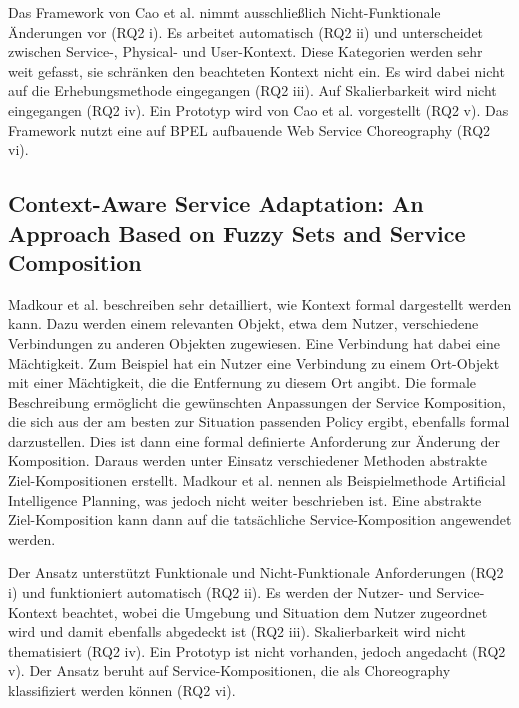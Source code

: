 \documentclass[conference,compsoc]{IEEEtran}
\begin{document}
Das Framework von Cao et al. \cite{CZZ15} nimmt ausschließlich Nicht-Funktionale Änderungen vor (RQ2 i). Es arbeitet automatisch (RQ2 ii) und unterscheidet zwischen Service-, Physical- und User-Kontext. Diese Kategorien werden sehr weit gefasst, sie schränken den beachteten Kontext nicht ein. Es wird dabei nicht auf die Erhebungsmethode eingegangen (RQ2 iii). Auf Skalierbarkeit wird nicht eingegangen (RQ2 iv). Ein Prototyp wird von Cao et al. \cite{CZZ15} vorgestellt (RQ2 v). Das Framework nutzt eine auf BPEL aufbauende Web Service Choreography (RQ2 vi).

\subsection{Context-Aware Service Adaptation: An Approach Based on Fuzzy Sets and Service Composition}
Madkour et al. \cite{MEM13} beschreiben sehr detailliert, wie Kontext formal dargestellt werden kann. Dazu werden einem relevanten Objekt, etwa dem Nutzer, verschiedene Verbindungen zu anderen Objekten zugewiesen. Eine Verbindung hat dabei eine Mächtigkeit. Zum Beispiel hat ein Nutzer eine Verbindung zu einem Ort-Objekt mit einer Mächtigkeit, die die Entfernung zu diesem Ort angibt. Die formale Beschreibung ermöglicht die gewünschten Anpassungen der Service Komposition, die sich aus der am besten zur Situation passenden Policy ergibt, ebenfalls formal darzustellen. Dies ist dann eine formal definierte Anforderung zur Änderung der Komposition. Daraus werden unter Einsatz verschiedener Methoden abstrakte Ziel-Kompositionen erstellt. Madkour et al. \cite{MEM13} nennen als Beispielmethode Artificial Intelligence Planning, was jedoch nicht weiter beschrieben ist. Eine abstrakte Ziel-Komposition kann dann auf die tatsächliche Service-Komposition angewendet werden.

Der Ansatz unterstützt Funktionale und Nicht-Funktionale Anforderungen (RQ2 i) und funktioniert automatisch (RQ2 ii). Es werden der Nutzer- und Service-Kontext beachtet, wobei die Umgebung und Situation dem Nutzer zugeordnet wird und damit ebenfalls abgedeckt ist (RQ2 iii). Skalierbarkeit wird nicht thematisiert (RQ2 iv). Ein Prototyp ist nicht vorhanden, jedoch angedacht (RQ2 v). Der Ansatz beruht auf Service-Kompositionen, die als Choreography klassifiziert werden können (RQ2 vi).
\end{document}
